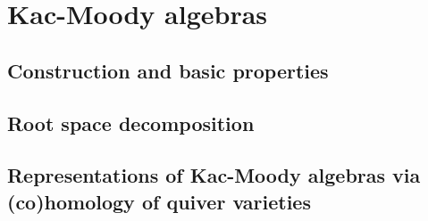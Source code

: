 \section{Kac-Moody algebras}
    \subsection{Construction and basic properties}
    
    \subsection{Root space decomposition}

    \subsection{Representations of Kac-Moody algebras via (co)homology of quiver varieties}